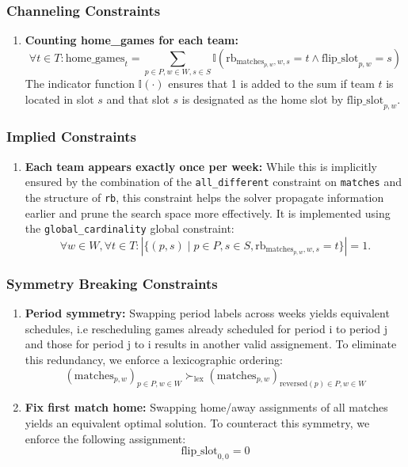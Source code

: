 \subsubsection{Channeling Constraints}
\begin{enumerate}
 \item \textbf{Counting home\_games for each team:}
\[ \forall t \in T : \text{home\_games}_{t} = \sum_{p \in P, w \in W, s \in S} \mathbb{I}\left( \text{rb}_{\text{matches}_{p, w}, w, s} = t \land \text{flip\_slot}_{p, w} = s \right) \]
The indicator function $\mathbb{I}(\cdot)$ ensures that 1 is added to the sum if team $t$ is located in slot $s$ and that slot $s$ is designated as the home slot by $\text{flip\_slot}_{p,w}$.
\end{enumerate}


\subsubsection{Implied Constraints}
\begin{enumerate}
   \item \textbf{Each team appears exactly once per week:}  While this is implicitly ensured by the combination of the \texttt{all\_different} constraint on \texttt{matches} and the structure of \texttt{rb}, this constraint helps the solver propagate information earlier and prune the search space more effectively.  It is implemented using the \texttt{global\_cardinality} global constraint:
    \[
     \forall w \in W, \forall t \in T : \left| \{ (p, s) \mid p \in P, s \in S, \text{rb}_{\text{matches}_{p, w}, w, s} = t \} \right| = 1.
 \]
\end{enumerate}



\subsubsection{Symmetry Breaking Constraints}

\begin{enumerate}
\item \textbf{Period symmetry:}
Swapping period labels across weeks yields equivalent schedules, i.e rescheduling games already scheduled for period i to period j and those for period j to i results in another valid assignement. To eliminate this redundancy, we enforce a lexicographic ordering:
$$
(\text{matches}_{p, w})_{p \in P, w \in W} \succ_{\text{lex}} (\text{matches}_{p, w})_{\text{reversed}(p) \in P, w \in W}
$$

\item \textbf{Fix first match home:} 
Swapping home/away assignments of all matches yields an equivalent optimal solution. To counteract this symmetry, we enforce the following assignment:
\[ \text{flip\_slot}_{0, 0} = 0 \]


\end{enumerate}


